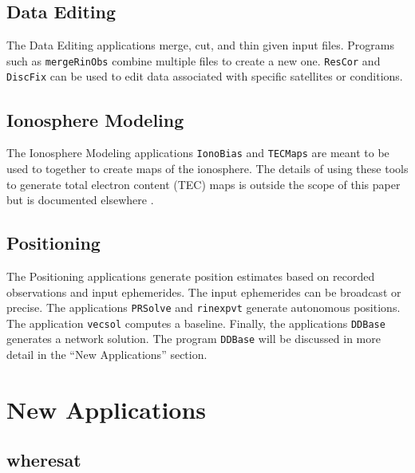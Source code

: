 \documentclass{ion-gps}
\newcommand{\gpstkapplication}[1]{\texttt{#1}}
\begin{document}
\subsection*{Data Editing}
The Data Editing applications merge, cut, and thin given input 
files. Programs such as \gpstkapplication{mergeRinObs} combine 
multiple files to create a new one. \gpstkapplication{ResCor} 
and \gpstkapplication{DiscFix} can be used to edit data associated 
with specific satellites or conditions.

\subsection*{Ionosphere Modeling}
The Ionosphere Modeling applications \gpstkapplication{IonoBias} 
and \gpstkapplication{TECMaps} are meant to be used to together 
to create maps of the ionosphere. The details of using these 
tools to generate total electron content (TEC) maps is outside 
the scope of this paper but is documented elsewhere \cite{beacon04}.

\subsection*{Positioning}
The Positioning applications generate position estimates based on 
recorded observations and input ephemerides. The input ephemerides 
can be broadcast or precise. The applications \gpstkapplication{PRSolve} 
and \gpstkapplication{rinexpvt} generate autonomous positions. 
The application \gpstkapplication{vecsol} computes a baseline. 
Finally, the applications \gpstkapplication{DDBase} generates a 
network solution. The program \gpstkapplication{DDBase} will be 
discussed in more detail in the ``New Applications'' section.



\section*{New Applications}

\subsection*{wheresat}
\end{document}
